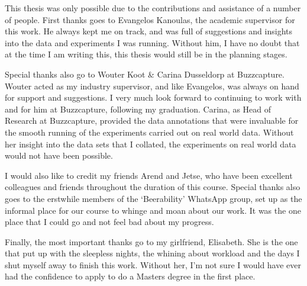 \documentclass[../main.tex]{subfiles}
\begin{document}
This thesis was only possible due to the contributions and assistance of a number of people. First thanks goes to Evangelos Kanoulas, the academic supervisor for this work. He always kept me on track, and was full of suggestions and insights into the data and experiments I was running. Without him, I have no doubt that at the time I am writing this, this thesis would still be in the planning stages.

Special thanks also go to Wouter Koot \& Carina Dusseldorp at Buzzcapture. Wouter acted as my industry supervisor, and like Evangelos, was always on hand for support and suggestions. I very much look forward to continuing to work with and for him at Buzzcapture, following my graduation. Carina, as Head of Research at Buzzcapture, provided the data annotations that were invaluable for the smooth running of the experiments carried out on real world data. Without her insight into the data sets that I collated, the experiments on real world data would not have been possible.

I would also like to credit my friends Arend and Jetse, who have been excellent colleagues and friends throughout the duration of this course. Special thanks also goes to the erstwhile members of the `Beerability' WhatsApp group, set up as the informal place for our course to whinge and moan about our work. It was the one place that I could go and not feel bad about my progress.

Finally, the most important thanks go to my girlfriend, Elisabeth. She is the one that put up with the sleepless nights, the whining about workload and the days I shut myself away to finish this work. Without her, I'm not sure I would have ever had the confidence to apply to do a Masters degree in the first place.
\end{document}
